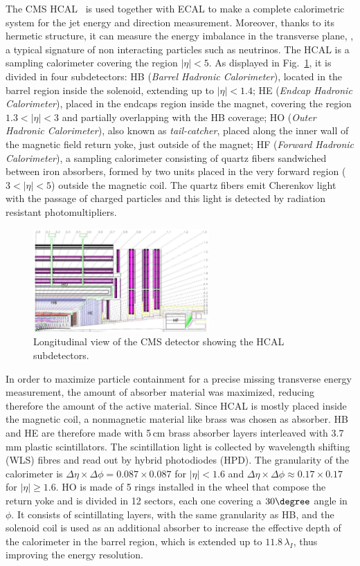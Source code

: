 The CMS HCAL~\cite{hcal} is used together with ECAL to make a complete calorimetric system for the jet energy and direction measurement. Moreover, thanks to its hermetic structure, it can measure the energy imbalance in the transverse plane, \MET, a typical signature of non interacting particles such as neutrinos. The HCAL is a sampling calorimeter covering the region $|\eta|<5$. As displayed in Fig.~\ref{fig:hcal}, it is divided in four subdetectors: HB (\emph{Barrel Hadronic Calorimeter}), located in the barrel region inside the solenoid, extending up to $|\eta|<1.4$; HE (\emph{Endcap Hadronic Calorimeter}), placed in the endcaps region inside the magnet, covering the region $1.3 < |\eta| < 3$ and partially overlapping with the HB coverage; HO (\emph{Outer Hadronic Calorimeter}), also known as \emph{tail-catcher}, placed along the inner wall of the magnetic field return yoke, just outside of the magnet; HF (\emph{Forward Hadronic Calorimeter}), a sampling calorimeter consisting of quartz fibers sandwiched between iron absorbers,
formed by two units placed in the very forward region ($3<|\eta|<5$) outside the magnetic coil. The quartz fibers emit Cherenkov light with the passage of charged particles and this light is detected by radiation resistant photomultipliers.
\begin{figure}[htb]
\centering
\includegraphics[width=0.6\textwidth]{images/hcal.png}
\caption{Longitudinal view of the CMS detector showing the HCAL subdetectors.}\label{fig:hcal}
\end{figure}
In order to maximize particle containment for a precise missing transverse energy measurement, the amount of absorber material was maximized, reducing therefore the amount of the active material. Since HCAL is mostly placed inside the magnetic coil, a nonmagnetic material like brass was chosen as absorber. HB and HE are therefore made with 5\,cm brass absorber layers interleaved with 3.7\,mm plastic scintillators. The scintillation light is collected by wavelength shifting (WLS) fibres and read out by hybrid photodiodes (HPD). The granularity of the calorimeter is $\Delta\eta\times\Delta\phi = 0.087 \times 0.087$ for $|\eta|<1.6$ and $\Delta\eta\times\Delta\phi \approx 0.17 \times 0.17$ for $|\eta|\geq1.6$. HO is made of 5 rings installed in the wheel that compose the return yoke and is divided in 12 sectors, each one covering a $30\degree$ angle in $\phi$. It consists of scintillating layers, with the same granularity as HB, and the solenoid coil is used as an additional absorber to increase the effective depth of the calorimeter in the barrel region, which is extended up to $11.8\,\lambda_I$, thus improving the energy resolution.

